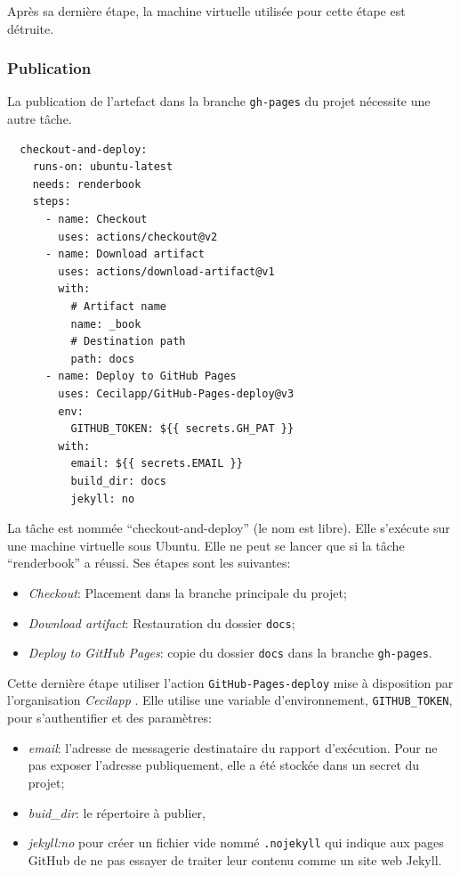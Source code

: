 \documentclass[
  12pt,
  french,
  a4paper,
  extrafontsizes,onecolumn,openright
  ]{memoir}
\providecommand{\tightlist}{%
  \setlength{\itemsep}{0pt}\setlength{\parskip}{0pt}}
\begin{document}
Après sa dernière étape, la machine virtuelle utilisée pour cette étape est détruite.

\hypertarget{publication}{%
\subsubsection{Publication}\label{publication}}

La publication de l'artefact dans la branche \texttt{gh-pages} du projet nécessite une autre tâche.

\begin{verbatim}
  checkout-and-deploy:
    runs-on: ubuntu-latest
    needs: renderbook
    steps:
      - name: Checkout
        uses: actions/checkout@v2
      - name: Download artifact
        uses: actions/download-artifact@v1
        with:
          # Artifact name
          name: _book
          # Destination path
          path: docs
      - name: Deploy to GitHub Pages
        uses: Cecilapp/GitHub-Pages-deploy@v3
        env:
          GITHUB_TOKEN: ${{ secrets.GH_PAT }}
        with:
          email: ${{ secrets.EMAIL }}
          build_dir: docs
          jekyll: no
\end{verbatim}

La tâche est nommée \enquote{checkout-and-deploy} (le nom est libre).
Elle s'exécute sur une machine virtuelle sous Ubuntu.
Elle ne peut se lancer que si la tâche \enquote{renderbook} a réussi.
Ses étapes sont les suivantes:

\begin{itemize}
\tightlist
\item
  \emph{Checkout}: Placement dans la branche principale du projet;
\item
  \emph{Download artifact}: Restauration du dossier \texttt{docs};
\item
  \emph{Deploy to GitHub Pages}: copie du dossier \texttt{docs} dans la branche \texttt{gh-pages}.
\end{itemize}

Cette dernière étape utiliser l'action \texttt{GitHub-Pages-deploy} mise à disposition par l'organisation \emph{Cecilapp} .
Elle utilise une variable d'environnement, \texttt{GITHUB\_TOKEN}, pour s'authentifier et des paramètres:

\begin{itemize}
\tightlist
\item
  \emph{email}: l'adresse de messagerie destinataire du rapport d'exécution.
  Pour ne pas exposer l'adresse publiquement, elle a été stockée dans un secret du projet;
\item
  \emph{buid\_dir}: le répertoire à publier,
\item
  \emph{jekyll:no} pour créer un fichier vide nommé \texttt{.nojekyll} qui indique aux pages GitHub de ne pas essayer de traiter leur contenu comme un site web Jekyll.
\end{itemize}
\end{document}
